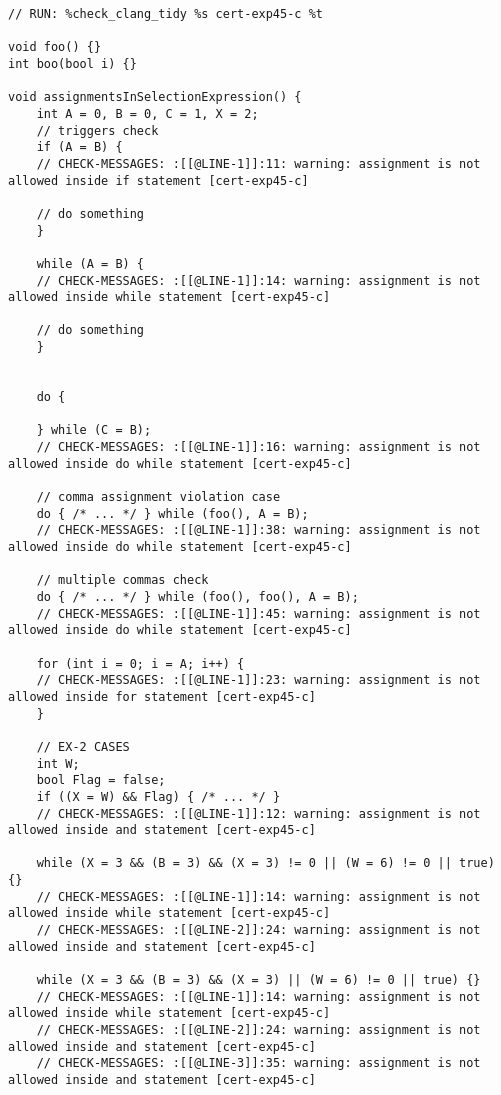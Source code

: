 \begin{code}
\begin{verbatim}
// RUN: %check_clang_tidy %s cert-exp45-c %t

void foo() {}
int boo(bool i) {}

void assignmentsInSelectionExpression() {
    int A = 0, B = 0, C = 1, X = 2;
    // triggers check 
    if (A = B) {
    // CHECK-MESSAGES: :[[@LINE-1]]:11: warning: assignment is not allowed inside if statement [cert-exp45-c]

    // do something 
    }

    while (A = B) {
    // CHECK-MESSAGES: :[[@LINE-1]]:14: warning: assignment is not allowed inside while statement [cert-exp45-c]
    
    // do something 
    }


    do {

    } while (C = B);
    // CHECK-MESSAGES: :[[@LINE-1]]:16: warning: assignment is not allowed inside do while statement [cert-exp45-c]

    // comma assignment violation case
    do { /* ... */ } while (foo(), A = B);
    // CHECK-MESSAGES: :[[@LINE-1]]:38: warning: assignment is not allowed inside do while statement [cert-exp45-c]
    
    // multiple commas check
    do { /* ... */ } while (foo(), foo(), A = B);
    // CHECK-MESSAGES: :[[@LINE-1]]:45: warning: assignment is not allowed inside do while statement [cert-exp45-c]

    for (int i = 0; i = A; i++) {
    // CHECK-MESSAGES: :[[@LINE-1]]:23: warning: assignment is not allowed inside for statement [cert-exp45-c]
    }

    // EX-2 CASES
    int W;
    bool Flag = false;
    if ((X = W) && Flag) { /* ... */ }
    // CHECK-MESSAGES: :[[@LINE-1]]:12: warning: assignment is not allowed inside and statement [cert-exp45-c]

    while (X = 3 && (B = 3) && (X = 3) != 0 || (W = 6) != 0 || true) {}   
    // CHECK-MESSAGES: :[[@LINE-1]]:14: warning: assignment is not allowed inside while statement [cert-exp45-c]
    // CHECK-MESSAGES: :[[@LINE-2]]:24: warning: assignment is not allowed inside and statement [cert-exp45-c]

    while (X = 3 && (B = 3) && (X = 3) || (W = 6) != 0 || true) {}
    // CHECK-MESSAGES: :[[@LINE-1]]:14: warning: assignment is not allowed inside while statement [cert-exp45-c]
    // CHECK-MESSAGES: :[[@LINE-2]]:24: warning: assignment is not allowed inside and statement [cert-exp45-c]
    // CHECK-MESSAGES: :[[@LINE-3]]:35: warning: assignment is not allowed inside and statement [cert-exp45-c]


\end{verbatim}
\end{code}
